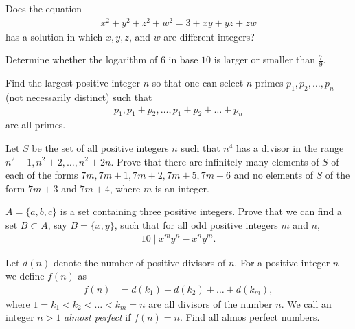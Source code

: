 \documentclass[problems.tex]{subfile}
\begin{document}
	\begin{problem}
		Does the equation
		\begin{align*}
			x^2+y^2+z^2+w^2=3 + xy + yz + zw
		\end{align*}
		has a solution in which $x, y, z$, and $w$ are different integers?
	\end{problem}

	\begin{problem}
		Determine whether the logarithm of $6$ in base $10$ is larger or smaller than $\displaystyle\frac{7}{9}$.
	\end{problem}


	\begin{problem}
		Find the largest positive integer $n$ so that one can select $n$ primes $p_1, p_2, \dots, p_n$ (not necessarily distinct) such that
		\begin{align*}
			p_1, p_1+p_2, \dots, p_1+p_2+\dots+p_n
		\end{align*}
		are all primes.
	\end{problem}




	\begin{problem}
		Let $S$ be the set of all positive integers $n$ such that $n^4$ has a divisor in the range $n^2 +1, n^2 + 2,\dots,n^2 + 2n$. Prove that there are infinitely many elements of $S$ of each of the forms $7m, 7m+1, 7m+2, 7m+5, 7m+6$ and no elements of $S$ of the form $7m+3$ and $7m+4$, where $m$ is an integer. %
	\end{problem}




	\begin{problem}
		$A=\{a,b,c\}$ is a set containing three positive integers. Prove that we can find a set $B \subset A$, say $B=\{x,y\}$, such that for all odd positive integers $m$ and $n$,
		\begin{align*}
			10 \mid x^m y^n - x^n y^m.
		\end{align*}
	\end{problem}



	\begin{problem}
		Let $d(n)$ denote the number of positive divisors of $n$. For a positive integer $n$ we define $f(n)$ as
		\begin{align*}
			f(n) & = d(k_1) + d(k_2) + \dots + d(k_m),
		\end{align*}
		where $ 1=k_1 < k_2 < \dots < k_m=n$ are all divisors of the number $n$. We call an integer $n>1$ \textit{almost perfect} if $f(n)=n$. Find all almos perfect numbers.
	\end{problem}
\end{document}
